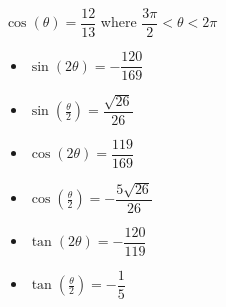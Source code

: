 {$\cos(\theta) = \dfrac{12}{13}$ where $\dfrac{3\pi}{2} < \theta < 2\pi$}
{\begin{itemize}
\item $\sin(2\theta) = -\dfrac{120}{169}$
\item $\sin\left(\frac{\theta}{2}\right) = \dfrac{\sqrt{26}}{26}$
\item $\cos(2\theta) = \dfrac{119}{169}$
\item $\cos\left(\frac{\theta}{2}\right) = -\dfrac{5\sqrt{26}}{26}$
\item $\tan(2\theta)=-\dfrac{120}{119}$
\item $\tan\left(\frac{\theta}{2}\right) = -\dfrac{1}{5}$
\end{itemize}}

